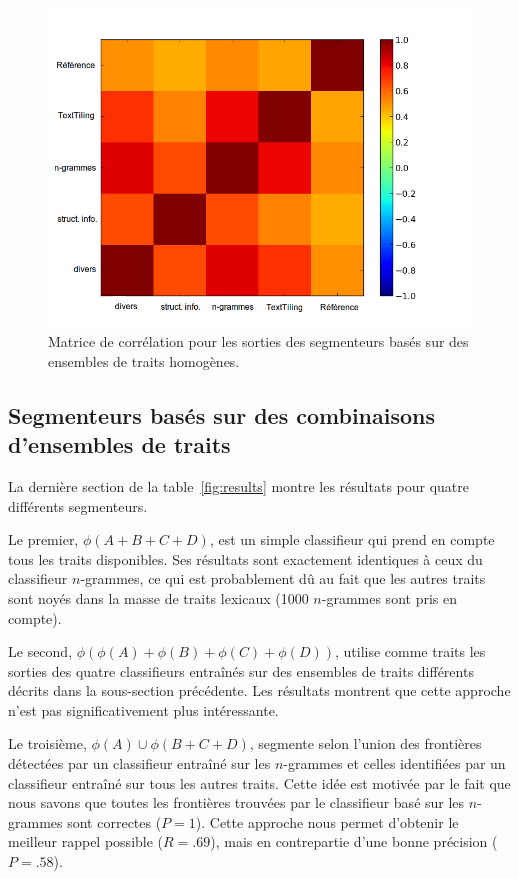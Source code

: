\begin{figure}[h!]
	\centering
	\includegraphics[width=\textwidth]{correlation.png}
	\caption{Matrice de corrélation pour les sorties des segmenteurs basés sur des ensembles de traits homogènes.}
\end{figure}

\subsection{Segmenteurs basés sur des combinaisons d'ensembles de traits}

La dernière section de la table~\ref{fig:results} montre les résultats pour quatre différents segmenteurs. 

Le premier, $\phi(A + B + C + D)$, est un simple classifieur qui prend en compte tous les traits disponibles. Ses résultats sont exactement identiques à ceux du classifieur $n$-grammes, ce qui est probablement dû au fait que les autres traits sont noyés dans la masse de traits lexicaux (1000 $n$-grammes sont pris en compte). 

Le second, $\phi(\phi(A) + \phi(B) + \phi(C) + \phi(D))$, utilise comme traits les sorties des quatre classifieurs entraînés sur des ensembles de traits différents décrits dans la sous-section précédente. Les résultats montrent que cette approche n'est pas significativement plus intéressante. 

Le troisième, $\phi(A) \cup \phi(B + C + D)$, segmente selon l'union des frontières détectées par un classifieur entraîné sur les $n$-grammes et celles identifiées par un classifieur entraîné sur tous les autres traits. Cette idée est motivée par le fait que nous savons que toutes les frontières trouvées par le classifieur basé sur les $n$-grammes sont correctes ($P=1$). Cette approche nous permet d'obtenir le meilleur rappel possible ($R=.69$), mais en contrepartie d'une bonne précision ($P=.58$). 


